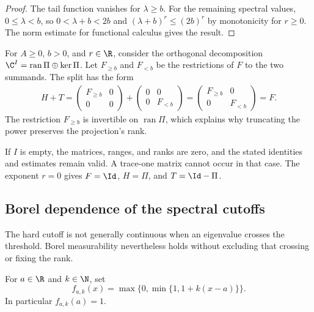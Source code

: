 \begin{proof}
    \leanok
    The tail function vanishes for $\lambda\ge b$. For the remaining
    spectral values, $0\le\lambda<b$, so $0<\lambda+b<2b$ and
    $(\lambda+b)^r\le(2b)^r$ by monotonicity for $r\ge0$.
    The norm estimate for functional calculus gives the result.
\end{proof}

For $A\ge0$, $b>0$, and $r\in\R$, consider the orthogonal decomposition
$\C^I=\operatorname{ran}\Pi\oplus\ker\Pi$. Let $F_{\ge b}$ and $F_{<b}$
be the restrictions of $F$ to the two summands. The split has the form
\begin{align}
    H+T
    =\begin{pmatrix}F_{\ge b}&0\\0&0\end{pmatrix}
    +\begin{pmatrix}0&0\\0&F_{<b}\end{pmatrix}
    =\begin{pmatrix}F_{\ge b}&0\\0&F_{<b}\end{pmatrix}=F.
\end{align}
The restriction $F_{\ge b}$ is invertible on $\operatorname{ran}\Pi$,
which explains why truncating the power preserves the projection's rank.

If $I$ is empty, the matrices, ranges, and ranks are zero, and the stated
identities and estimates remain valid. A trace-one matrix cannot occur in
that case. The exponent $r=0$ gives $F=\Id$, $H=\Pi$, and $T=\Id-\Pi$.


\subsection{Borel dependence of the spectral cutoffs}

The hard cutoff is not generally continuous when an eigenvalue crosses the
threshold. Borel measurability nevertheless holds without excluding that
crossing or fixing the rank.

\begin{definition}
    \label{def:closed_threshold_ramp}
    \leanok
    For $a\in\R$ and $k\in\N$, set
    \[
        f_{a,k}(x)=\max\{0,\min\{1,1+k(x-a)\}\}.
    \]
    In particular $f_{a,k}(a)=1$.
\end{definition}

